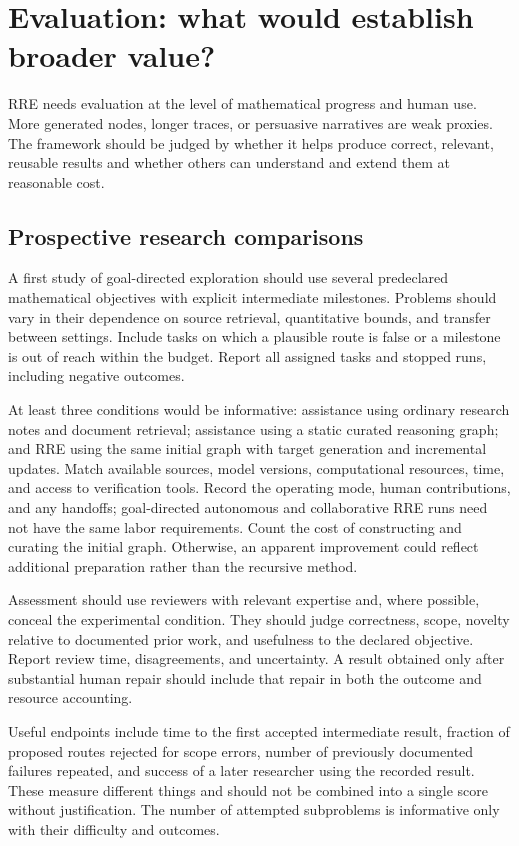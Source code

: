 \section{Evaluation: what would establish broader value?}\label{sec:evaluation}

RRE needs evaluation at the level of mathematical progress and human use. More generated nodes, longer traces, or persuasive narratives are weak proxies. The framework should be judged by whether it helps produce correct, relevant, reusable results and whether others can understand and extend them at reasonable cost.

\subsection{Prospective research comparisons}

A first study of goal-directed exploration should use several predeclared mathematical objectives with explicit intermediate milestones. Problems should vary in their dependence on source retrieval, quantitative bounds, and transfer between settings. Include tasks on which a plausible route is false or a milestone is out of reach within the budget. Report all assigned tasks and stopped runs, including negative outcomes.

At least three conditions would be informative: assistance using ordinary research notes and document retrieval; assistance using a static curated reasoning graph; and RRE using the same initial graph with target generation and incremental updates. Match available sources, model versions, computational resources, time, and access to verification tools. Record the operating mode, human contributions, and any handoffs; goal-directed autonomous and collaborative RRE runs need not have the same labor requirements. Count the cost of constructing and curating the initial graph. Otherwise, an apparent improvement could reflect additional preparation rather than the recursive method.

Assessment should use reviewers with relevant expertise and, where possible, conceal the experimental condition. They should judge correctness, scope, novelty relative to documented prior work, and usefulness to the declared objective. Report review time, disagreements, and uncertainty. A result obtained only after substantial human repair should include that repair in both the outcome and resource accounting.

Useful endpoints include time to the first accepted intermediate result, fraction of proposed routes rejected for scope errors, number of previously documented failures repeated, and success of a later researcher using the recorded result. These measure different things and should not be combined into a single score without justification. The number of attempted subproblems is informative only with their difficulty and outcomes.


